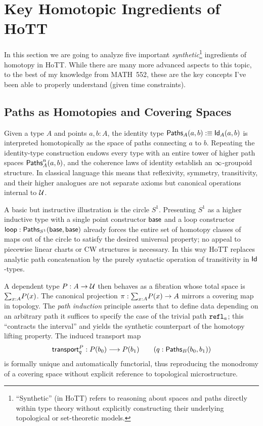 \section{Key Homotopic Ingredients of HoTT}\label{sec:components}

In this section we are going to analyze five important \emph{synthetic}\footnote{``Synthetic'' (in HoTT) refers to reasoning about spaces and paths directly within type theory without explicitly constructing their underlying topological or set-theoretic models.} ingredients of homotopy in HoTT.
While there are many more advanced aspects to this topic, to the best of my knowledge from MATH~552, these are the key concepts I've been able to properly understand (given time constraints).

\subsection{Paths as Homotopies and Covering Spaces}\label{sec:paths}
Given a type \(A\) and points \(a,b:A\), the identity type
\(\textsf{Paths}_A(a,b):\equiv\textsf{Id}_A(a,b)\) is interpreted homotopically as the
space of paths connecting \(a\) to \(b\).
Repeating the identity-type construction endows every type with an entire
tower of higher path spaces \(\textsf{Paths}_A^{n}(a,b)\), and the coherence laws of
identity establish an \(\infty\)-groupoid structure.
In classical language this means that reflexivity, symmetry, transitivity,
and their higher analogues are not separate axioms but canonical
operations internal to \(\mathcal{U}\).

A basic but instructive illustration is the circle \(S^1\).  
Presenting \(S^1\) as a higher inductive type with a single point constructor \(\textsf{base}\) and a loop constructor
\(\textsf{loop}:\textsf{Paths}_{S^1}(\textsf{base},\textsf{base})\) already forces the entire set of
homotopy classes of maps out of the circle to satisfy the desired
universal property; no appeal to piecewise linear charts or CW
structures is necessary.  In this way HoTT replaces analytic path
concatenation by the purely syntactic operation of transitivity in
\(\textsf{Id}\)-types.

A dependent type \(P:A\to\mathcal{U}\) then behaves as a fibration whose total
space is \(\textstyle\mathbf{\sum}_{x:A}P(x)\).  The canonical projection
\(\pi:\textstyle\mathbf{\sum}_{x:A}P(x)\to A\) mirrors a covering map in topology.  The
\emph{path induction} principle asserts that to define data depending
on an arbitrary path it suffices to specify the case of the
trivial path \(\texttt{refl}_a\); this ``contracts the interval'' and yields the
synthetic counterpart of the homotopy lifting property.  The induced
transport map
\[
  \textsf{transport}^{P}_{q}:P(b_0)\longrightarrow P(b_1)\qquad(q:\textsf{Paths}_B(b_0,b_1))
\]
is formally unique and automatically functorial, thus reproducing the
monodromy of a covering space without explicit reference to
topological microstructure.


